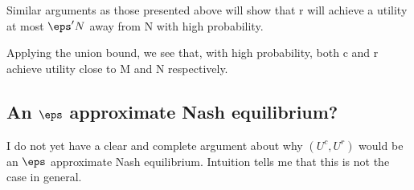 \documentclass[10pt]{amsart}
\begin{document}
Similar arguments as those presented above will show that r will achieve a utility at most $\eps' N$ away from N with high probability.

Applying the union bound, we see that, with high probability, both c and r achieve utility close to M and N respectively.

\subsection{An $\eps$ approximate Nash equilibrium?}

I do not yet have a clear and complete argument about why $(U^{c}, U^{r})$ would be an $\eps$ approximate Nash equilibrium. Intuition tells me that this is not the case in general.




\end{document}
